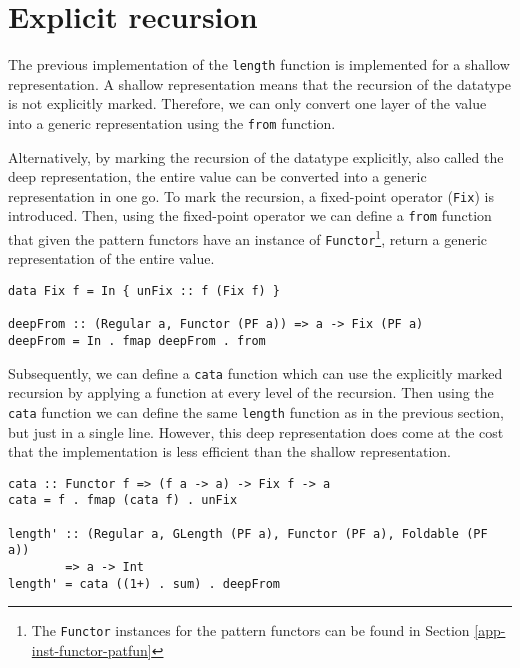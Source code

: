 \section{Explicit recursion}
\label{sec-explicit-recursion}


The previous implementation of the \texttt{length} function is implemented for a shallow representation. A shallow representation means that the recursion of the datatype is not explicitly marked. Therefore, we can only convert one layer of the value into a generic representation using the \texttt{from} function. 

Alternatively, by marking the recursion of the datatype explicitly, also called the deep representation, the entire value can be converted into a generic representation in one go. To mark the recursion, a fixed-point operator (\texttt{Fix}) is introduced. Then, using the fixed-point operator we can define a \texttt{from} function that given the pattern functors have an instance of \texttt{Functor}\footnote{The \texttt{Functor} instances for the pattern functors can be found in Section \ref{app-inst-functor-patfun}}, return a generic representation of the entire value.

\begin{verbatim}
data Fix f = In { unFix :: f (Fix f) }

deepFrom :: (Regular a, Functor (PF a)) => a -> Fix (PF a)
deepFrom = In . fmap deepFrom . from
\end{verbatim}

Subsequently, we can define a \texttt{cata} function which can use the explicitly marked recursion by applying a function at every level of the recursion. Then using the \texttt{cata} function we can define the same \texttt{length} function as in the previous section, but just in a single line. However, this deep representation does come at the cost that the implementation is less efficient than the shallow representation. 

\begin{verbatim}
cata :: Functor f => (f a -> a) -> Fix f -> a
cata = f . fmap (cata f) . unFix

length' :: (Regular a, GLength (PF a), Functor (PF a), Foldable (PF a)) 
        => a -> Int
length' = cata ((1+) . sum) . deepFrom
\end{verbatim}